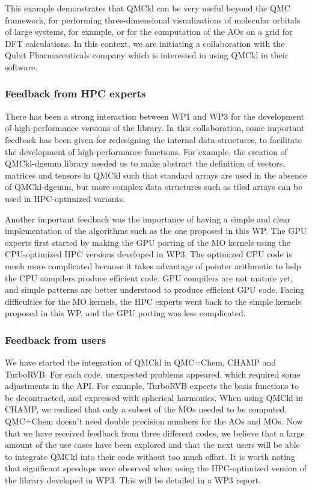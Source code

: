 This example demonstrates that QMCkl can be very useful beyond the \ac{QMC}
framework, for performing three-dimensional visualizations of molecular
orbitals of large systems, for example, or for the computation of the
\acp{AO} on a grid for \ac{DFT} calculations. In this context, we are
initiating a collaboration with the Qubit Pharmaceuticals company
which is interested in using QMCkl in their software.

\subsubsection{Feedback from HPC experts}

There has been a strong interaction between WP1 and WP3 for the
development of high-performance versions of the library. In this
collaboration, some important feedback has been given for redesigning
the internal data-structures, to facilitate the development of
high-performance functions. 
For example, the creation of QMCkl-dgemm library needed us to make abstract the
definition of vectors, matrices and tensors in QMCkl such that standard
arrays are used in the absence of QMCkl-dgemm, but more complex data
structures such as tiled arrays can be used in HPC-optimized variants.

Another important feedback was the importance of having a simple and clear
implementation of the algorithms such as the one proposed in this \ac{WP}.
The GPU experts first started by making the GPU porting of the \ac{MO} kernels
using the CPU-optimized HPC versions developed in WP3. The optimized CPU code
is much more complicated because it takes advantage of pointer arithmetic to help the
CPU compilers produce efficient code. GPU compilers are not mature yet, and simple
patterns are better understood to produce efficient GPU code. Facing difficulties
for the \ac{MO} kernels, the HPC experts went back to the simple kernels
proposed in this \ac{WP}, and the GPU porting was less complicated.


\subsubsection{Feedback from users}

We have started the integration of QMCkl in QMC=Chem, CHAMP and
TurboRVB. For each code, unexpected problems appeared, which required some
adjustments in the \ac{API}. For example, TurboRVB expects the basis functions
to be decontracted, and expressed with spherical harmonics.
When using QMCkl in CHAMP, we realized that only a subset of the \acp{MO}
needed to be computed. QMC=Chem doesn't need double precision numbers for the
\acp{AO} and \acp{MO}. Now that we have received feedback from three different
codes, we believe that a large amount of the use cases have been explored and that the
next users will be able to integrate QMCkl into their code without too much
effort. It is worth noting that significant speedups were observed when using
the HPC-optimized version of the library developed in WP3. This will be detailed
in a WP3 report.


